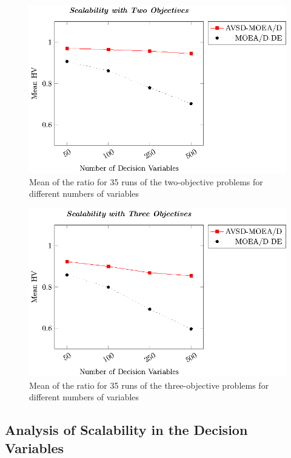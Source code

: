 \begin{figure}[t]
\centering
\includegraphics[scale=0.75]{images/Graphic-Scalability-2obj_tikz-figure0.eps}
\caption{Mean of the \HV{} ratio for 35 runs of the two-objective problems for different numbers of variables}\label{fig:scalability-2obj}
\end{figure}

\begin{figure}[t]
\centering
\includegraphics[scale=0.75]{images/Graphic-Scalability-3obj_tikz-figure0.eps}
\caption{Mean of the \HV{} ratio for 35 runs of the three-objective problems for different numbers of variables} \label{fig:scalability-3obj}
\end{figure}

\subsection{Analysis of Scalability in the Decision Variables}

